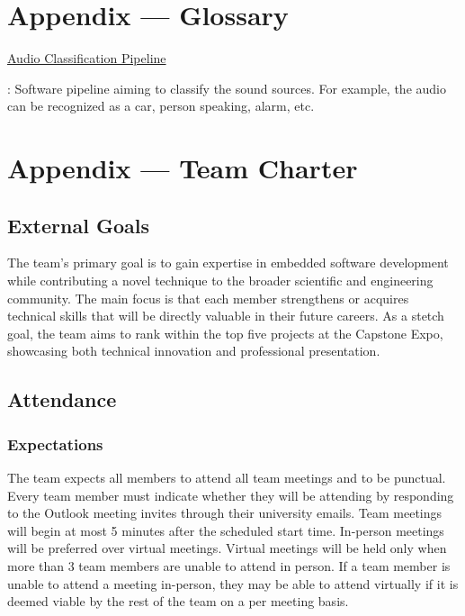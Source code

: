 \documentclass{article}
\begin{document}
\newpage{}

\section*{Appendix --- Glossary}


\hypertarget{audio_classification_pipeline}{\underline{Audio Classification
Pipeline}}: Software pipeline aiming to classify the sound sources. For example,
the audio can be recognized as a car, person speaking, alarm, etc.

\newpage{}

\section*{Appendix --- Team Charter}

\subsection*{External Goals}

The team's primary goal is to gain expertise in embedded software development
while contributing a novel technique to the broader scientific and engineering
community. The main focus is that each member strengthens or acquires technical
skills that will be directly valuable in their future careers. As a stetch goal,
the team aims to rank within the top five projects at the Capstone Expo,
showcasing both technical innovation and professional presentation.

\subsection*{Attendance}

\subsubsection*{Expectations}

The team expects all members to attend all team meetings and to be punctual.
Every team member must indicate whether they will be attending by responding to
the Outlook meeting invites through their university emails. Team meetings will
begin at most 5 minutes after the scheduled start time. In-person meetings will
be preferred over virtual meetings. Virtual meetings will be held only when more
than 3 team members are unable to attend in person. If a team member is unable
to attend a meeting in-person, they may be able to attend virtually if it is
deemed viable by the rest of the team on a per meeting basis.
\end{document}
